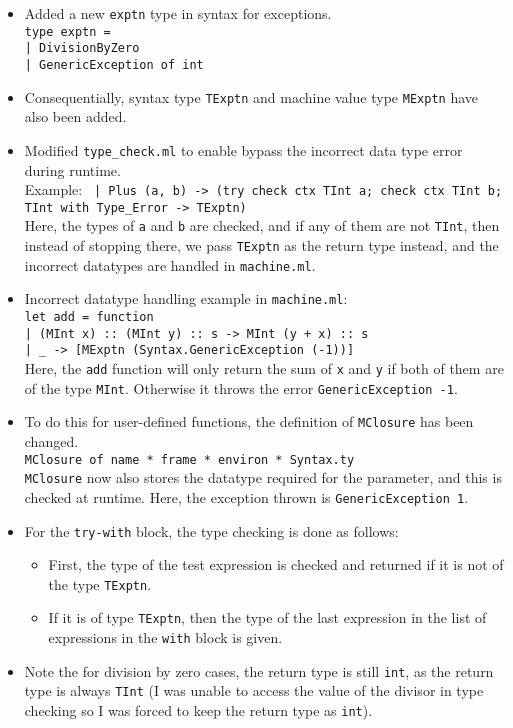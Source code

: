 \documentclass{article}
\begin{document}
    \begin{itemize}
        \item Added a new \texttt{exptn} type in syntax for exceptions.\\\texttt{type exptn =\\| DivisionByZero \\| GenericException of int}
        \item Consequentially, syntax type \texttt{TExptn} and machine value type \texttt{MExptn} have also been added.
        \item Modified \texttt{type\_check.ml} to enable bypass the incorrect data type error during runtime. \\Example: \texttt{    | Plus (a, b) -> (try check ctx TInt a; check ctx TInt b; TInt with Type\_Error -> TExptn)}\\Here, the types of \texttt{a} and \texttt{b} are checked, and if any of them are not \texttt{TInt}, then instead of stopping there, we pass \texttt{TExptn} as the return type instead, and the incorrect datatypes are handled in \texttt{machine.ml}.
        \item Incorrect datatype handling example in \texttt{machine.ml}:\\\texttt{let add = function\\| (MInt x) :: (MInt y) :: s -> MInt (y + x) :: s\\| \_ -> [MExptn (Syntax.GenericException (-1))]}\\Here, the \texttt{add} function will only return the sum of \texttt{x} and \texttt{y} if both of them are of the type \texttt{MInt}. Otherwise it throws the error \texttt{GenericException -1}.
        \item To do this for user-defined functions, the definition of \texttt{MClosure} has been changed.\\\texttt{MClosure of name * frame * environ * Syntax.ty}\\\texttt{MClosure} now also stores the datatype required for the parameter, and this is checked at runtime. Here, the exception thrown is \texttt{GenericException 1}.
        \item For the \texttt{try-with} block, the type checking is done as follows:
            \begin{itemize}
                \item First, the type of the test expression is checked and returned if it is not of the type \texttt{TExptn}.
                \item If it is of type \texttt{TExptn}, then the type of the last expression in the list of expressions in the \texttt{with} block is given.
            \end{itemize}
        \item Note the for division by zero cases, the return type is still \texttt{int}, as the return type is always \texttt{TInt} (I was unable to access the value of the divisor in type checking so I was forced to keep the return type as \texttt{int}).
    \end{itemize}
\end{document}
